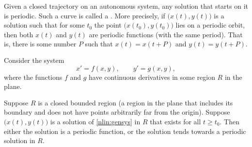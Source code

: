 \documentclass[12pt]{book}
\begin{document}
%

Given a closed trajectory on an autonomous system,
any solution that starts on it is periodic.
Such a curve is called a
\emph{}.
More precisely, if
$\bigl(x(t),y(t)\bigr)$
is a solution such that for some $t_0$ the point
$\bigl(x(t_0),y(t_0)\bigr)$ lies on a periodic orbit, then both $x(t)$ and $y(t)$
are periodic functions (with the same period).  That is, there is some
number $P$ such that $x(t) = x(t+P)$ and $y(t) = y(t+P)$.

Consider the system
\begin{equation} \label{nlin:gensys}
x' = f(x,y), \qquad y' = g(x,y) ,
\end{equation}
where the functions $f$ and $g$ have continuous derivatives in some region
$R$ in the plane.

\begin{theorem}%
Suppose $R$ is a closed bounded region (a region in the plane that includes
its boundary and does not have points arbitrarily far from the origin).
Suppose $\bigl(x(t), y(t)\bigr)$ is a solution of
\eqref{nlin:gensys} in $R$ that exists
for all $t \geq t_0$.  Then either the solution is a periodic function,
or the solution tends towards a periodic solution in $R$.
\end{theorem}
\end{document}

